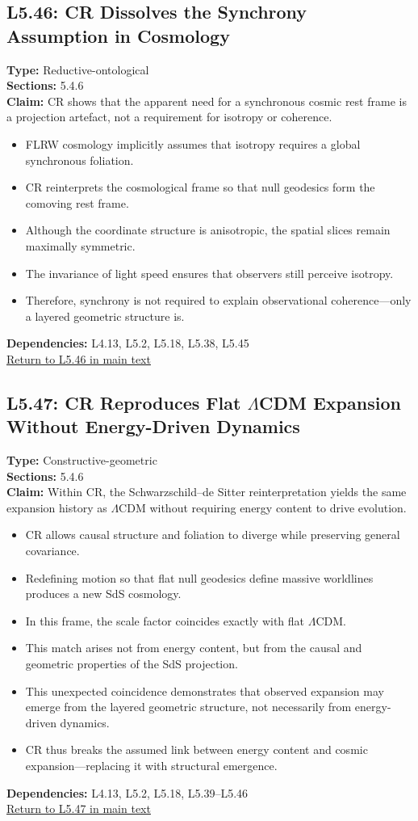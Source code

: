 \documentclass[12pt]{book}
\newcommand{\returnlink}[1]{\hyperref[logic:#1]{Return to #1 in main text}\xspace}
\begin{document}
\subsection*{L5.46: CR Dissolves the Synchrony Assumption in Cosmology}
\label{appendix:L5.46}
\textbf{Type:} Reductive-ontological \\
\textbf{Sections:} 5.4.6 \\
\textbf{Claim:} CR shows that the apparent need for a synchronous cosmic rest frame is a projection artefact, not a requirement for isotropy or coherence.
\begin{itemize}
  \item FLRW cosmology implicitly assumes that isotropy requires a global synchronous foliation.
  \item CR reinterprets the cosmological frame so that null geodesics form the comoving rest frame.
  \item Although the coordinate structure is anisotropic, the spatial slices remain maximally symmetric.
  \item The invariance of light speed ensures that observers still perceive isotropy.
  \item Therefore, synchrony is not required to explain observational coherence---only a layered geometric structure is.
\end{itemize}
\textbf{Dependencies:} L4.13, L5.2, L5.18, L5.38, L5.45 \\
\returnlink{L5.46}

\subsection*{L5.47: CR Reproduces Flat $\Lambda$CDM Expansion Without Energy-Driven Dynamics}
\label{appendix:L5.47}
\textbf{Type:} Constructive-geometric \\
\textbf{Sections:} 5.4.6 \\
\textbf{Claim:} Within CR, the Schwarzschild–de Sitter reinterpretation yields the same expansion history as $\Lambda$CDM without requiring energy content to drive evolution.
\begin{itemize}
  \item CR allows causal structure and foliation to diverge while preserving general covariance.
  \item Redefining motion so that flat null geodesics define massive worldlines produces a new SdS cosmology.
  \item In this frame, the scale factor coincides exactly with flat $\Lambda$CDM.
  \item This match arises not from energy content, but from the causal and geometric properties of the SdS projection.
  \item This unexpected coincidence demonstrates that observed expansion may emerge from the layered geometric structure, not necessarily from energy-driven dynamics.
  \item CR thus breaks the assumed link between energy content and cosmic expansion---replacing it with structural emergence.
\end{itemize}
\textbf{Dependencies:} L4.13, L5.2, L5.18, L5.39–L5.46 \\
\returnlink{L5.47}
\end{document}
